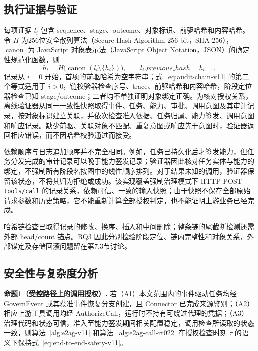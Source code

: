 \subsection{执行证据与验证}

每项证据 $l_i$ 包含 sequence、stage、outcome、对象标识、前驱哈希和内容哈希。令 $H$ 为256位安全散列算法（Secure Hash Algorithm 256-bit，SHA-256），$\operatorname{canon}$ 为 JavaScript 对象表示法（JavaScript Object Notation，JSON）的确定性规范化函数，则
\begin{equation}
h_i=H\bigl(\operatorname{canon}(l_i\setminus\{h_i\})\bigr),\qquad
l_i.previous\_hash=h_{i-1}.
\label{eq:audit-chain-v11}
\end{equation}
记录从 $i=0$ 开始，首项的前驱哈希为空字符串；式~\eqref{eq:audit-chain-v11} 的第二个等式适用于 $i>0$。链校验器检查序号、trace、前驱哈希和内容哈希，阶段定位器检查已知 stage/outcome；二者均不单独证明对象绑定正确。为核对授权关系，离线验证器从同一一致性快照取得事件、任务、能力、审批、调用意图及其审计记录，按对象标识建立关联，并依次检查准入依据、任务归属、能力签发、调用意图和响应记录。缺少前驱、关联对象不匹配、重复意图或响应先于意图时，验证器返回相应错误，而不因哈希校验通过而接受。

依赖顺序与日志追加顺序并不完全相同。例如，任务已持久化后才签发能力，但任务分发完成的审计记录可以晚于能力签发记录；验证器因此核对任务实体与能力的绑定，不强制所有阶段名按图中的线性顺序排列。对于结果未知的调用，验证器保留该状态，不将其归为拒绝或成功。该实现覆盖强制治理模式下 HTTP POST \texttt{tools/call} 的记录关系，依赖可信、一致的输入快照；由于快照不保存全部原始请求参数和历史策略，它不能重新计算全部授权判定，也不能证明上游业务已经完成。

哈希链检查已取得记录的修改、换序、插入和中间删除；整条链的尾截断检测还需外部 head/count 锚点。RQ3 因此分别检验阶段定位、链内完整性和对象关系，外部锚定及存储回滚问题留在第7.3节讨论。

\subsection{安全性与复杂度分析}

\noindent\textbf{命题1（受控路径上的调用授权）.}
若（A1）本文范围内的事件驱动任务均经 GovernEvent 或其获准事件恢复分支创建，且 Connector 已完成来源鉴别；（A2）相应上游工具调用均经 AuthorizeCall，运行时不持有可绕过代理的凭据；（A3）治理代码和状态可信，准入至能力签发期间相关配置稳定，调用检查所读取的状态一致，则算法~\ref{alg:e2ag-v11} 和算法~\ref{alg:e2ag-call-rr022} 在授权检查时刻 $\tau$ 的语义下保持式~\eqref{eq:end-to-end-safety-v11}。

